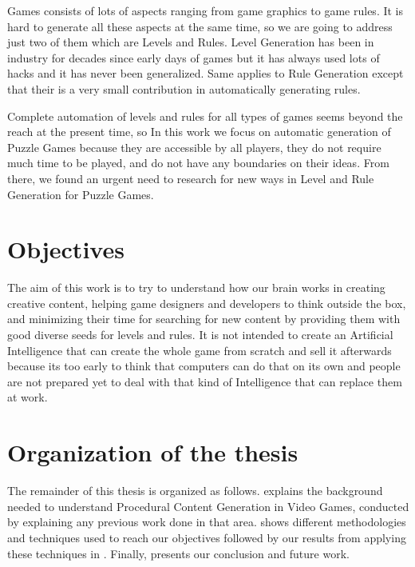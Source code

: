 Games consists of lots of aspects ranging from game graphics to game rules. It is hard to generate all these aspects at the same time, so we are going to address just two of them which are Levels and Rules. Level Generation has been in industry for decades since early days of games \cite{pcgFirstGame} but it has always used lots of hacks and it has never been generalized. Same applies to Rule Generation except that their is a very small contribution in automatically generating rules.\\\par

Complete automation of levels and rules for all types of games seems beyond the reach at the present time, so In this work we focus on automatic generation of Puzzle Games because they are accessible by all players, they do not require much time to be played, and do not have any boundaries on their ideas. From there, we found an urgent need to research for new ways in Level and Rule Generation for Puzzle Games.

\section{Objectives}
The aim of this work is to try to understand how our brain works in creating creative content, helping game designers and developers to think outside the box, and minimizing their time for searching for new content by providing them with good diverse seeds for levels and rules. It is not intended to create an Artificial Intelligence that can create the whole game from scratch and sell it afterwards because its too early to think that computers can do that on its own and people are not prepared yet to deal with that kind of Intelligence that can replace them at work.


\section{Organization of the thesis}
The remainder of this thesis is organized as follows.  explains the background needed to understand Procedural Content Generation in Video Games, conducted by  explaining any previous work done in that area.  shows different methodologies and techniques used to reach our objectives followed by our results from applying these techniques in . Finally,  presents our conclusion and future work.